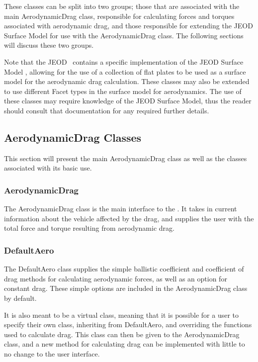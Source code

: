 These classes can be split into two groups; those that are associated with the
main AerodynamicDrag class, responsible for calculating forces and torques
associated with aerodynamic drag, and those responsible for extending the
JEOD Surface Model \cite{dynenv:SURFACEMODEL} for use with the
AerodynamicDrag class. The following sections will discuss these two groups.

Note that the JEOD \aerodynamicsDesc\ contains a specific implementation of
the JEOD Surface Model \cite{dynenv:SURFACEMODEL}, allowing for the use of a collection
of flat plates to be used as a surface model for the aerodynamic drag calculation.
These classes may also be extended to use different Facet types in the surface model
for aerodynamics.
The use of these classes may require knowledge of the JEOD Surface Model, thus the reader
should consult that documentation \cite{dynenv:SURFACEMODEL} for any required further
details.

\subsection{AerodynamicDrag Classes}

This section will present the main AerodynamicDrag class as well as the classes associated
with its basic use.

\subsubsection{AerodynamicDrag}

The AerodynamicDrag class is the main interface to the \aerodynamicsDesc. It takes
in current information about the vehicle affected by the drag, and supplies
the user with the total force and torque resulting from aerodynamic drag.

\subsubsection{DefaultAero}

The DefaultAero class supplies the simple ballistic coefficient and coefficient of drag
methods for calculating aerodynamic forces, as well as an option for constant drag. These
simple options are included in the AerodynamicDrag class by default.

It is also meant to be a virtual class, meaning that it is possible for a user to specify
their own class, inheriting from DefaultAero, and overriding the functions used to calculate
drag. This class can then be given to the AerodynamicDrag class, and a new method for
calculating drag can be implemented with little to no change to the user interface.

